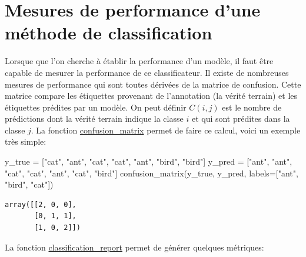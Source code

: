 \documentclass[
  11pt,
  letterpaper,
  open=any,
  twoside=false,
  french]{scrbook}
\newenvironment{Shaded}{\begin{snugshade}}{\end{snugshade}}
\newcommand{\NormalTok}[1]{\textcolor[rgb]{0.00,0.23,0.31}{#1}}
\newcommand{\OperatorTok}[1]{\textcolor[rgb]{0.37,0.37,0.37}{#1}}
\newcommand{\StringTok}[1]{\textcolor[rgb]{0.13,0.47,0.30}{#1}}
\begin{document}
\section{Mesures de performance d'une méthode de
classification}\label{mesures-de-performance-dune-muxe9thode-de-classification}

Lorsque que l'on cherche à établir la performance d'un modèle, il faut
être capable de mesurer la performance de ce classificateur. Il existe
de nombreuses mesures de performance qui sont toutes dérivées de la
matrice de confusion. Cette matrice compare les étiquettes provenant de
l'annotation (la vérité terrain) et les étiquettes prédites par un
modèle. On peut définir \(C(i,j)\) est le nombre de prédictions dont la
vérité terrain indique la classe \(i\) et qui sont prédites dans la
classe \(j\). La fonction
\href{https://scikit-learn.org/stable/modules/generated/sklearn.metrics.confusion_matrix.html}{confusion\_matrix}
permet de faire ce calcul, voici un exemple très simple:

\begin{Shaded}
\begin{Highlighting}[]
\NormalTok{y\_true }\OperatorTok{=}\NormalTok{ [}\StringTok{"cat"}\NormalTok{, }\StringTok{"ant"}\NormalTok{, }\StringTok{"cat"}\NormalTok{, }\StringTok{"cat"}\NormalTok{, }\StringTok{"ant"}\NormalTok{, }\StringTok{"bird"}\NormalTok{, }\StringTok{"bird"}\NormalTok{]}
\NormalTok{y\_pred }\OperatorTok{=}\NormalTok{ [}\StringTok{"ant"}\NormalTok{, }\StringTok{"ant"}\NormalTok{, }\StringTok{"cat"}\NormalTok{, }\StringTok{"cat"}\NormalTok{, }\StringTok{"ant"}\NormalTok{, }\StringTok{"cat"}\NormalTok{, }\StringTok{"bird"}\NormalTok{]}
\NormalTok{confusion\_matrix(y\_true, y\_pred, labels}\OperatorTok{=}\NormalTok{[}\StringTok{"ant"}\NormalTok{, }\StringTok{"bird"}\NormalTok{, }\StringTok{"cat"}\NormalTok{])}
\end{Highlighting}
\end{Shaded}

\begin{verbatim}
array([[2, 0, 0],
       [0, 1, 1],
       [1, 0, 2]])
\end{verbatim}

La fonction
\href{https://scikit-learn.org/stable/modules/generated/sklearn.metrics.classification_report.html\#sklearn.metrics.classification_report}{classification\_report}
permet de générer quelques métriques:
\end{document}
